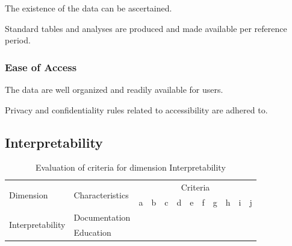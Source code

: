 \begin{QandA}
    \item The existence of the data can be ascertained.
    \begin{answered}
        
    \end{answered}

    \item Standard tables and analyses are produced and made available per reference period.
    \begin{answered}
        
    \end{answered}

\end{QandA}

\subsubsection{Ease of Access}

\begin{QandA}
    \item The data are well organized and readily available for users.
    \begin{answered}
        
    \end{answered}

    \item Privacy and confidentiality rules related to accessibility are adhered to.
    \begin{answered}
        
    \end{answered}

\end{QandA}

\subsection{Interpretability}

\begin{table}[htbp]
    \centering

    \begin{tabular}{llrrrrrrrrrr}
        \toprule
        \multirow{2}{*}{Dimension}          & \multirow{2}{*}{Characteristics}  & \multicolumn{10}{c}{Criteria}         \\ \cmidrule(lr){3-12}
                                            &                                   & a & b & c & d & e & f & g & h & i & j \\ \midrule
        \multirow{2}{*}{Interpretability}   & Documentation                     &   &   &   &   &   &   &   &   &   &   \\
                                            & Education                         &   &   &   &   &   &   &   &   &   &   \\
        \bottomrule
    \end{tabular}

    \caption{Evaluation of criteria for dimension Interpretability}
    \label{table:interpretability-benchmark}
\end{table}
\FloatBarrier

